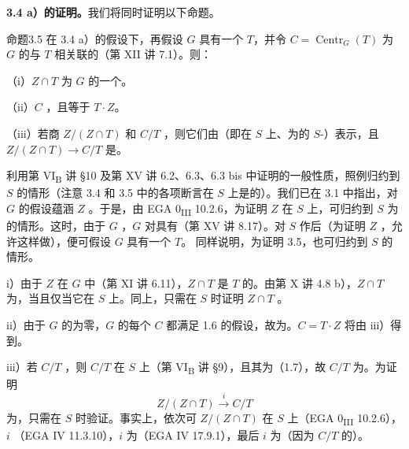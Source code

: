 \textbf{3.4 a）的证明。}我们将同时证明以下命题。
\begin{SGAresult}{命题}{3.5}
在 3.4 a）的假设下，再假设 $G$ 具有一个 $T$，并令 $C=\operatorname{Centr}_G(T)$ 为 $G$ 的与 $T$ 相关联的（第 XII 讲 7.1）。则：

（i）$Z\cap T$ 为 $G$ 的一个。

（ii）$C$ ，且等于 $T\cdot Z$。

（iii）若商 $Z/(Z\cap T)$ 和 $C/T$ ，则它们由（即在 $S$ 上、为的 $S$-）表示，且 $Z/(Z\cap T)\to C/T$ 是。
\end{SGAresult}
利用第 VI\textsubscript{B} 讲 §10 及第 XV 讲 6.2、6.3、6.3 bis 中证明的一般性质，照例归约到 $S$ 的情形（注意 3.4 和 3.5 中的各项断言在 $S$ 上是的）。我们已在 3.1 中指出，对 $G$ 的假设蕴涵 $Z$ 。于是，由 EGA 0\textsubscript{III} 10.2.6，为证明 $Z$ 在 $S$ 上，可归约到 $S$ 为的情形。这时，由于 $G$ ，$G$ 对具有（第 XV 讲 8.17）。对 $S$ 作后（为证明 $Z$ ，允许这样做），便可假设 $G$ 具有一个 $T$。
同样说明，为证明 3.5，也可归约到 $S$ 的情形。

 i）由于 $Z$ 在 $G$ 中（第 XI 讲 6.11），$Z\cap T$ 是 $T$ 的。由第 X 讲 4.8 b），$Z\cap T$ 为，当且仅当它在 $S$ 上。同上，只需在 $S$ 时证明 $Z\cap T$ 。

 ii）由于 $G$ 的为零，$G$ 的每个 $C$ 都满足 1.6 的假设，故为。$C=T\cdot Z$ 将由 iii）得到。

 iii）若 $C/T$ ，则 $C/T$ 在 $S$ 上（第 VI\textsubscript{B} 讲 §9），且其为（1.7），故 $C/T$ 为。为证明
\[Z/(Z\cap T)\xrightarrow{i}C/T\]
为，只需在 $S$ 时验证。事实上，依次可 $Z/(Z\cap T)$ 在 $S$ 上（EGA 0\textsubscript{III} 10.2.6），$i$ （EGA IV 11.3.10），$i$ 为（EGA IV 17.9.1），最后 $i$ 为（因为 $C/T$ 的）。

